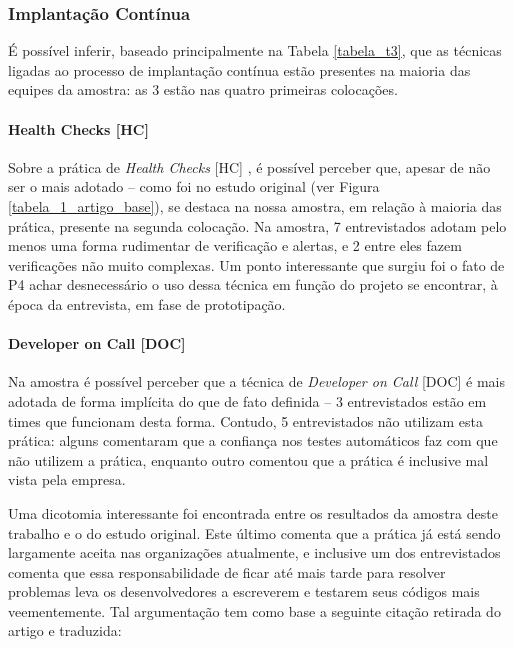 \subsubsection{Implantação Contínua}

É possível inferir, baseado principalmente na Tabela \ref{tabela_t3}, que as técnicas ligadas ao processo de implantação contínua estão presentes na maioria das equipes da amostra: as 3 estão nas quatro primeiras colocações. 

\paragraph{Health Checks [HC]}

Sobre a prática de \emph{Health Checks} [HC] \cite{devopsBook}, é possível perceber que, apesar de não ser o mais adotado -- como foi no estudo original (ver Figura \ref{tabela_1_artigo_base}), se destaca na nossa amostra, em relação à maioria das prática, presente na segunda colocação. Na amostra, 7 entrevistados adotam pelo menos uma forma rudimentar de verificação e alertas, e 2 entre eles fazem verificações não muito complexas. Um ponto interessante que surgiu foi o fato de P4 achar desnecessário o uso dessa técnica em função do projeto se encontrar, à época da entrevista, em fase de prototipação.

\paragraph{Developer on Call [DOC]}

Na amostra é possível perceber que a técnica de \emph{Developer on Call} [DOC] \cite{devAndDeploymentFB} é mais adotada de forma implícita do que de fato definida -- 3 entrevistados estão em times que funcionam desta forma. Contudo, 5 entrevistados não utilizam esta prática: alguns comentaram que a confiança nos testes automáticos faz com que não utilizem a prática, enquanto outro comentou que a prática é inclusive mal vista pela empresa.

Uma dicotomia interessante foi encontrada entre os resultados da amostra deste trabalho e o do estudo original. Este último comenta que a prática já está sendo largamente aceita nas organizações atualmente, e inclusive um dos entrevistados comenta que essa responsabilidade de ficar até mais tarde para resolver problemas leva os desenvolvedores a escreverem e testarem seus códigos mais veementemente. Tal argumentação tem como base a seguinte citação retirada do artigo e traduzida:

